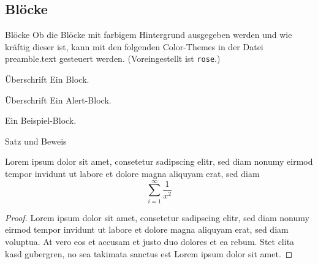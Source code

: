 \subsection{Blöcke}

\begin{frame}[fragile]{Blöcke}
Ob die Blöcke mit farbigem Hintergrund ausgegeben werden und wie kräftig
dieser ist, kann mit den folgenden Color-Themes in der Datei preamble.text 
gesteuert werden. (Voreingestellt ist \texttt{rose}.)

  \begin{block}{Überschrift}
    Ein Block.
  \end{block}
  \begin{alertblock}{Überschrift}
    Ein Alert-Block.
  \end{alertblock}
  \begin{example}
    Ein Beispiel-Block.
  \end{example}
\end{frame}

\begin{frame}{Satz und Beweis}
  \begin{theorem}%
    Lorem ipsum dolor sit amet, consetetur sadipscing elitr, sed diam nonumy
    eirmod tempor invidunt ut labore et dolore magna aliquyam erat, sed diam
    \begin{equation}
      \label{eq:Satz}
      \sum_{i=1}^{\infty}\frac{1}{x^2}
    \end{equation}
  \end{theorem}
  \begin{proof}%
    Lorem ipsum dolor sit amet, consetetur sadipscing elitr, sed diam nonumy
    eirmod tempor invidunt ut labore et dolore magna aliquyam erat, sed diam
    voluptua. At vero eos et accusam et justo duo dolores et ea rebum. Stet
    clita kasd gubergren, no sea takimata sanctus est Lorem ipsum dolor sit
    amet. 
  \end{proof}
\end{frame}


